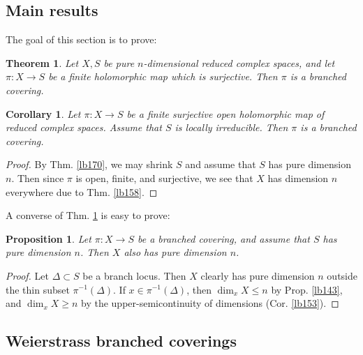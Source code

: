 \documentclass[12pt,b5paper,notitlepage]{report}
\theoremstyle{definition}
\theoremstyle{plain}
\newtheorem{thm}[df]{Theorem}
\newtheorem{pp}[df]{Proposition}
\newtheorem{co}[df]{Corollary}
\numberwithin{equation}{section}
\begin{document}
\subsection{Main results}


The goal of this section is to prove:


\begin{thm}\label{lb198}
Let $X,S$ be pure $n$-dimensional reduced complex spaces, and let $\pi:X\rightarrow S$ be a finite holomorphic map which is surjective. Then $\pi$ is a branched covering.
\end{thm}



\begin{co}\label{lb233}
Let $\pi:X\rightarrow S$ be a finite surjective open holomorphic map of reduced complex spaces. Assume that $S$ is locally irreducible. Then $\pi$ is a branched covering.
\end{co}


\begin{proof}
By Thm. \ref{lb170}, we may shrink $S$ and assume that $S$ has pure dimension $n$. Then since $\pi$ is open, finite, and surjective, we see that $X$ has dimension $n$ everywhere due to Thm. \ref{lb158}.
\end{proof}





A converse of Thm. \ref{lb198} is easy to prove:

\begin{pp}
Let $\pi:X\rightarrow S$ be a branched covering, and assume that $S$ has pure dimension $n$. Then $X$ also has pure dimension $n$.
\end{pp}


\begin{proof}
Let $\Delta\subset S$ be a branch locus. Then $X$ clearly has pure dimension $n$ outside the thin subset $\pi^{-1}(\Delta)$. If $x\in \pi^{-1}(\Delta)$, then $\dim_xX\leq n$ by Prop. \ref{lb143}, and $\dim_xX\geq n$ by the upper-semicontinuity of dimensions (Cor. \ref{lb153}).
\end{proof}











\subsection{Weierstrass branched coverings}
\end{document}
